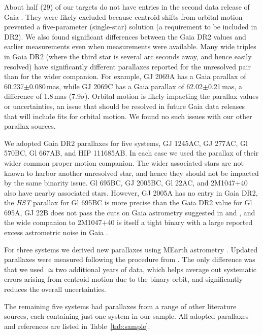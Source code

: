 \documentclass[twocolumn]{aastex62}
\begin{document}
About half (29) of our targets do not have entries in the second data release of Gaia \citep[DR2, ][]{GaiaDr2,Gaia-Collaboration:2018aa}. They were likely excluded because centroid shifts from orbital motion prevented a five-parameter (single-star) solution (a requirement to be included in DR2). We also found significant differences between the Gaia DR2 values and earlier measurements \citep[including from TGAS, ][]{2015A&A...574A.115M,gaiadr1} even when measurements were available. Many wide triples in Gaia DR2 (where the third star is several arc seconds away, and hence easily resolved) have significantly different parallaxes reported for the unresolved pair than for the wider companion. For example, GJ 2069A has a Gaia parallax of 60.237$\pm$0.080\,mas, while GJ 2069C has a Gaia parallax of 62.02$\pm$0.21\,mas, a difference of 1.8\,mas (7.9$\sigma$). Orbital motion is likely impacting the parallax values or uncertainties, an issue that should be resolved in future Gaia data releases that will include fits for orbital motion. We found no such issues with our other parallax sources.

We adopted Gaia DR2 parallaxes for five systems, GJ 1245AC, GJ 277AC, Gl 570BC, Gl 667AB, and HIP 111685AB. In each case we used the parallax of their wider common proper motion companion. The wider associated stars are not known to harbor another unresolved star, and hence they should not be impacted by the same binarity issue. Gl 695BC, GJ 2005BC, Gl 22AC, and 2M1047+40 also have nearby associated stars. However, GJ 2005A has no entry in Gaia DR2, the {\it HST} parallax for Gl 695BC is more precise than the Gaia DR2 value for Gl 695A, GJ 22B does not pass the cuts on Gaia astrometry suggested in \citet{GaiaDr2} and \citet{Dr2_HR}, and the wide companion to 2M1047+40 is itself a tight binary \citep[LP 213-67AB,][]{Dupuy2017} with a large reported excess astrometric noise in Gaia \citep[a sign of binarity, ][]{2018RNAAS...2...20E}.

For three systems we derived new parallaxes using MEarth astrometry \citep{Nutzman:2008gf}. Updated parallaxes were measured following the procedure from \citet{2014ApJ...784..156D}. The only difference was that we used $\simeq$two additional years of data, which helps average out systematic errors arising from centroid motion due to the binary orbit, and significantly reduces the overall uncertainties. 

The remaining five systems had parallaxes from a range of other literature sources, each containing just one system in our sample. All adopted parallaxes and references are listed in Table~\ref{tab:sample}.
\end{document}
